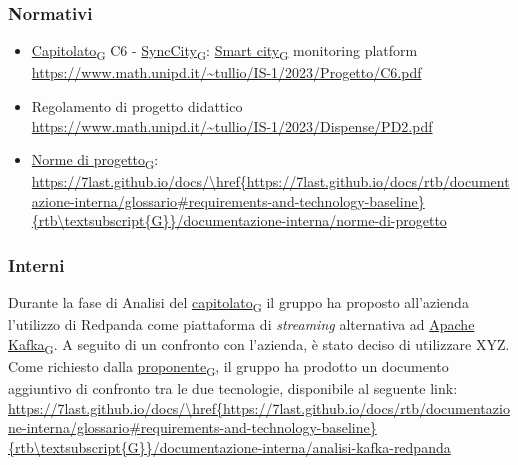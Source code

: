 \subsubsection{Normativi}
\begin{itemize}
	\item \href{https://7last.github.io/docs/rtb/documentazione-interna/glossario\#capitolato}{Capitolato\textsubscript{G}} C6 - \href{https://7last.github.io/docs/rtb/documentazione-interna/glossario\#synccity}{SyncCity\textsubscript{G}}: \href{https://7last.github.io/docs/rtb/documentazione-interna/glossario\#smart-city}{Smart city\textsubscript{G}} monitoring platform\\
	      \url{https://www.math.unipd.it/~tullio/IS-1/2023/Progetto/C6.pdf}
	\item Regolamento di progetto didattico\\
	      \url{https://www.math.unipd.it/~tullio/IS-1/2023/Dispense/PD2.pdf}
	\item \href{https://7last.github.io/docs/rtb/documentazione-interna/glossario\#norme-di-progetto}{Norme di progetto\textsubscript{G}}:\\
	      \url{https://7last.github.io/docs/\href{https://7last.github.io/docs/rtb/documentazione-interna/glossario\#requirements-and-technology-baseline}{rtb\textsubscript{G}}/documentazione-interna/norme-di-progetto}
\end{itemize}

\subsubsection{Interni}
Durante la fase di Analisi del \href{https://7last.github.io/docs/rtb/documentazione-interna/glossario\#capitolato}{capitolato\textsubscript{G}} il gruppo ha proposto all'azienda
l'utilizzo di Redpanda come piattaforma di \textit{streaming} alternativa ad \href{https://7last.github.io/docs/rtb/documentazione-interna/glossario\#apache-kafka}{Apache Kafka\textsubscript{G}}.
A seguito di un confronto con l'azienda, è stato deciso di utilizzare XYZ.\\
Come richiesto dalla \href{https://7last.github.io/docs/rtb/documentazione-interna/glossario\#proponente}{proponente\textsubscript{G}}, il gruppo ha prodotto un documento aggiuntivo di
confronto tra le due tecnologie, disponibile al seguente link:\\
\url{https://7last.github.io/docs/\href{https://7last.github.io/docs/rtb/documentazione-interna/glossario\#requirements-and-technology-baseline}{rtb\textsubscript{G}}/documentazione-interna/analisi-kafka-redpanda}
